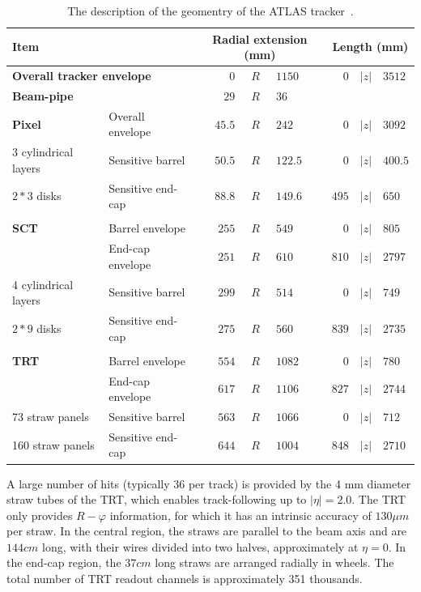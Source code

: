 \begin{table}[ht!]
\centering
\begin{tabular}{ll | r@{$<$}c@{$<$}l | r@{$<$}c@{$<$}l} \hline\hline
\multicolumn{2}{l|}{\bf Item} & \multicolumn{3}{c|}{\bf Radial extension (mm)} & \multicolumn{3}{c}{\bf Length (mm)} \\\hline
\multicolumn{2}{l|}{\bf Overall tracker envelope} & $0$&$R$&$1150$ & $0$&$|z|$&$3512$ \\
\multicolumn{2}{l|}{\bf Beam-pipe} & $29$&$R$&$36$ & \multicolumn{3}{c}{}\\\hline
{\bf Pixel} & Overall envelope & $45.5$&$R$&$242$ & $0$&$|z|$&$3092$ \\
3 cylindrical layers & Sensitive barrel & $50.5$&$R$&$122.5$ & $0$&$|z|$&$400.5$ \\
$2*3$ disks & Sensitive end-cap & $88.8$&$R$&$149.6$ & $495$&$|z|$&$650$ \\
\multicolumn{2}{l|}{} & \multicolumn{3}{c|}{} & \multicolumn{3}{c}{}\\
{\bf SCT} & Barrel envelope & $255$&$R$&$549$ & $0$&$|z|$&$805$ \\
 & End-cap envelope & $251$&$R$&$610$ & $810$&$|z|$&$2797$ \\
4 cylindrical layers & Sensitive barrel & $299$&$R$&$514$ & $0$&$|z|$&$749$ \\
$2*9$ disks & Sensitive end-cap & $275$&$R$&$560$ & $839$&$|z|$&$2735$ \\
\multicolumn{2}{l|}{} & \multicolumn{3}{c|}{} & \multicolumn{3}{c}{}\\
{\bf TRT} & Barrel envelope & $554$&$R$&$1082$ & $0$&$|z|$&$780$ \\
 & End-cap envelope & $617$&$R$&$1106$ & $827$&$|z|$&$2744$ \\
73 straw panels & Sensitive barrel & $563$&$R$&$1066$ & $0$&$|z|$&$712$ \\
160 straw panels & Sensitive end-cap & $644$&$R$&$1004$ & $848$&$|z|$&$2710$ \\
\hline\hline
\end{tabular}
\caption{The description of the geomentry of the ATLAS tracker~\cite{ATLASdet}.}
\label{tab:ATLAS_tracker}
\end{table}

A large number of hits (typically 36 per track) is provided by the 4 mm diameter straw tubes
of the TRT, which enables track-following up to $|\eta|=2.0$. The TRT only provides $R-\varphi$ information, for which it has an intrinsic accuracy of $130 \mu m$ per straw. In the central region, the straws are
parallel to the beam axis and are $144 cm$ long, with their wires divided into two halves, approximately at $\eta = 0$. In the end-cap region, the $37 cm$ long straws are arranged radially in wheels. The
total number of TRT readout channels is approximately 351 thousands.

